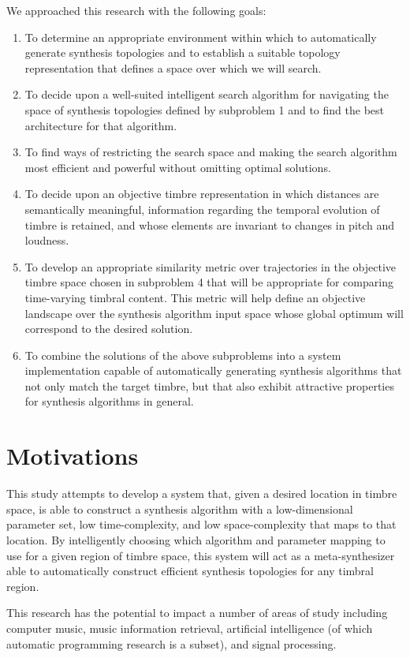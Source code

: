 \documentclass[a4paper,12pt]{report} 	%
\numberwithin{figure}{chapter}
\numberwithin{table}{chapter}
\numberwithin{equation}{chapter}
\begin{document}
\begin{flushleft}
We approached this research with the following goals:
\begin{enumerate}
\item To determine an appropriate environment within which to automatically generate synthesis topologies and to establish a suitable topology representation that defines a space over which we will search.
\item To decide upon a well-suited intelligent search algorithm for navigating the space of synthesis topologies defined by subproblem 1 and to find the best architecture for that algorithm.
\item To find ways of restricting the search space and making the search algorithm most efficient and powerful without omitting optimal solutions.
\item To decide upon an objective timbre representation in which distances are semantically meaningful, information regarding the temporal evolution of timbre is retained, and whose elements are invariant to changes in pitch and loudness.
\item To develop an appropriate similarity metric over trajectories in the objective timbre space chosen in subproblem 4 that will be appropriate for comparing time-varying timbral content. This metric will help define an objective landscape over the synthesis algorithm input space whose global optimum will correspond to the desired solution.
\item To combine the solutions of the above subproblems into a system implementation capable of automatically generating synthesis algorithms that not only match the target timbre, but that also exhibit attractive properties for synthesis algorithms in general.
\end{enumerate}

\section{Motivations}
This study attempts to develop a system that, given a desired location in timbre space, is able to construct a synthesis algorithm with a low-dimensional parameter set, low time-complexity, and low space-complexity that maps to that location. By intelligently choosing which algorithm and parameter mapping to use for a given region of timbre space, this system will act as a meta-synthesizer able to automatically construct efficient synthesis topologies for any timbral region.

This research has the potential to impact a number of areas of study including computer music, music information retrieval, artificial intelligence (of which automatic programming research is a subset), and signal processing.


\end{flushleft}
\end{document}
